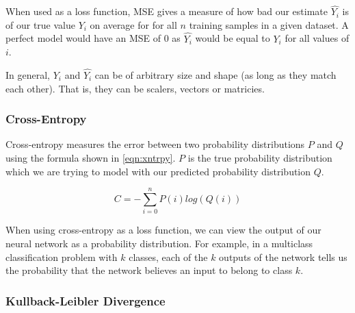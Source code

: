 When used as a loss function, \ac{MSE} gives a measure of how bad our estimate $\hat{Y_i}$ is of our true value $Y_i$ on average for for all $n$ training samples in a given dataset. A perfect model would have an \ac{MSE} of 0 as $\hat{Y_i}$ would be equal to $Y_i$ for all values of $i$.

In general, $Y_i$ and $\hat{Y_i}$ can be of arbitrary size and shape (as long as they match each other). That is, they can be scalers, vectors or matricies.

\subsubsection{Cross-Entropy}
Cross-entropy measures the error between two probability distributions $P$ and $Q$ using the formula shown in \autoref{eqn:xntrpy}. $P$ is the true probability distribution which we are trying to model with our predicted probability distribution $Q$.

\begin{equation} \label{eqn:xntrpy}
C = -\sum_{i=0}^{n}P(i) log(Q(i))
\end{equation}

When using cross-entropy as a loss function, we can view the output of our neural network as a probability distribution. For example, in a multiclass classification problem with $k$ classes, each of the $k$ outputs of the network tells us the probability that the network believes an input to belong to class $k$.


%
%
%
%


\subsubsection{Kullback-Leibler Divergence}

